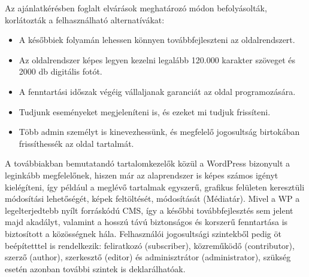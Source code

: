 Az ajánlatkérésben foglalt elvárások meghatározó módon befolyásolták, korlátozták a felhasználható alternatívákat:
\begin{itemize}
	\item A későbbiek folyamán lehessen könnyen továbbfejleszteni az oldalrendszert.
	\item Az oldalrendszer képes legyen kezelni legalább 120.000 karakter szöveget és 2000 db digitális fotót.
	\item A fenntartási időszak végéig vállaljanak garanciát az oldal programozására.
	\item Tudjunk eseményeket megjeleníteni is, és ezeket mi tudjuk frissíteni.
	\item Több admin személyt is kinevezhessünk, és megfelelő jogosultság birtokában frissíthessék az oldal tartalmát.
\end{itemize}

A továbbiakban bemutatandó tartalomkezelők közül a WordPress bizonyult a leginkább megfelelőnek, hiszen már az alaprendszer is képes számos igényt kielégíteni, így például a meglévő tartalmak egyszerű, grafikus felületen keresztüli módosítási lehetőségét, képek feltöltését, módosítását (Médiatár). Mivel a WP a legelterjedtebb nyílt forráskódú CMS, így a későbbi továbbfejlesztés sem jelent majd akadályt, valamint a hosszú távú biztonságos és korszerű fenntartása is biztosított a közösségnek hála. Felhasználói jogosultsági szintekből pedig öt beépítetttel is rendelkezik: feliratkozó (subscriber), közreműködő (contributor), szerző (author), szerkesztő (editor) és adminisztrátor (administrator), szükség esetén azonban további szintek is deklarálhatóak.